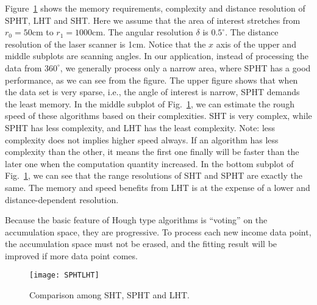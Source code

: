 \documentclass[]{spie}
\newcommand{\draft}{no} %
\def\grapath{../img/}
\let\myimg\includegraphics
\renewcommand{\includegraphics}[2][width=0.45\textwidth]{\ifthenelse{\equal{\draft}{yes}} 
    {\centerline{\myimg[#1,draft]{\grapath #2}}}
    {%
        {\ifthenelse{\equal{\draft}{fast}}
            {\centerline{\fbox{Figure #2 will be here}}}
            {\centerline{\myimg[#1]{\grapath #2}}}
        }
    }
}
\begin{document}
    Figure~\ref{fig:SPHTLHT} shows the memory requirements, complexity and distance resolution of SPHT, LHT and SHT. Here we assume that the area of interest stretches from $r_0=50$cm to $r_1=1000$cm. The angular resolution $\delta$ is $0.5^\circ$. The distance resolution of the laser scanner is 1cm. Notice that the $x$ axis of the upper and middle subplots are scanning angles. In our application, instead of processing the data from $360^\circ$, we generally process only a narrow area, where SPHT has a good performance, as we can see from the figure. The upper figure shows that when the data set is very sparse, i.e., the angle of interest is narrow, SPHT demands the least memory. In the middle subplot of Fig.~\ref{fig:SPHTLHT}, we can estimate the rough speed of these algorithms based on their complexities.  SHT is very complex, while SPHT has less complexity, and LHT has the least complexity. Note: less complexity does not implies higher speed always. If an algorithm has less complexity than the other, it means the first one finally will be faster than the later one when the computation quantity increased. In the bottom subplot of Fig.~\ref{fig:SPHTLHT}, we can see that the range resolutions of SHT and SPHT are exactly the same. The memory and speed benefits from LHT is at the expense of a lower and distance-dependent resolution. 
    
    Because the basic feature of Hough type algorithms is ``voting'' on the accumulation space, they are progressive. To process each new income data point, the accumulation space must not be erased, and the fitting result will be improved if more data point comes. 

\begin{figure}[!htb]
    \centering
    \begin{minipage}{90mm}
    \texttt{[image: SPHTLHT]}
    \caption{Comparison among SHT, SPHT and LHT.}\label{fig:SPHTLHT}
    \end{minipage}\hspace{3mm}
\end{figure}

%
\end{document}
